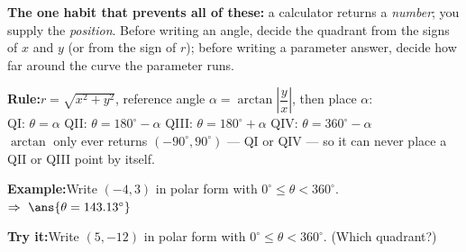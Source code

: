 \documentclass[12pt]{article}
\begin{document}

\noindent\small\textbf{The one habit that prevents all of these:} a calculator returns a
\emph{number}; you supply the \emph{position}. Before writing an angle, decide the quadrant from
the signs of $x$ and $y$ (or from the sign of $r$); before writing a parameter answer, decide how
far around the curve the parameter runs.\normalsize

\begin{formulabox}\textbf{Rule:}\quad $r = \sqrt{x^2 + y^2}$, \quad reference angle
$\alpha = \arctan\left|\dfrac{y}{x}\right|$, \quad then place $\alpha$:\\[3pt]
QI: $\theta = \alpha$ \quad QII: $\theta = 180^\circ - \alpha$ \quad
QIII: $\theta = 180^\circ + \alpha$ \quad QIV: $\theta = 360^\circ - \alpha$\\[3pt]
$\arctan$ only ever returns $(-90^\circ, 90^\circ)$ --- QI or QIV --- so it can never place a
QII or QIII point by itself.
\end{formulabox}
\begin{examplebox}\textbf{Example:}\quad Write $(-4, 3)$ in polar form with
$0^\circ \le \theta < 360^\circ$.
$\Rightarrow\ \ans{\theta = 143.13^\circ}$
\end{examplebox}
\begin{tryitbox}\textbf{Try it:}\quad Write $(5, -12)$ in polar form with
$0^\circ \le \theta < 360^\circ$. (Which quadrant?)\\[2pt]
\end{tryitbox}
\end{document}
